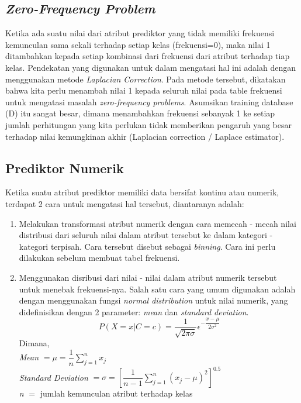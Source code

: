 \subsection{\textit{Zero-Frequency Problem}}
\label{subsec:Zero-Frequency Problem}
\cite{PeughMissing:2004} 
Ketika ada suatu nilai dari atribut prediktor yang tidak memiliki frekuensi kemunculan sama sekali terhadap setiap kelas (frekuensi=0), maka nilai 1 ditambahkan kepada setiap kombinasi dari frekuensi dari atribut terhadap tiap kelas. Pendekatan yang digunakan untuk dalam mengatasi hal ini adalah dengan menggunakan metode \textit{Laplacian Correction}. Pada metode tersebut, dikatakan bahwa kita perlu menambah nilai 1 kepada seluruh nilai pada table frekuensi untuk mengatasi masalah \textit{zero-frequency problems}. Asumsikan training database (D) itu sangat besar, dimana menambahkan frekuensi sebanyak 1 ke setiap jumlah perhitungan yang kita perlukan tidak memberikan pengaruh yang besar terhadap nilai kemungkinan akhir (Laplacian correction / Laplace estimator).

\subsection{Prediktor Numerik}
\label{subsec:Prediktor Numerik}
\cite{garg2013design} 
Ketika suatu atribut prediktor memiliki data bersifat kontinu atau numerik, terdapat 2 cara untuk mengatasi hal tersebut, diantaranya adalah:
\begin{enumerate}
	\item Melakukan transformasi atribut numerik dengan cara memecah - mecah nilai distribusi dari seluruh nilai dalam atribut tersebut ke dalam kategori - kategori terpisah. Cara tersebut disebut sebagai \textit{binning}. Cara ini perlu dilakukan sebelum membuat tabel frekuensi.
	
	\item Menggunakan disribusi dari nilai - nilai dalam atribut numerik tersebut untuk menebak frekuensi-nya. Salah satu cara yang umum digunakan adalah dengan menggunakan fungsi \textit{normal distribution} untuk nilai numerik, yang didefinisikan dengan 2 parameter: \textit{mean} dan \textit{standard deviation}.
	\begin{equation}
	P(X=x|C=c) = \dfrac{1}{\sqrt{2\pi\sigma}}\epsilon^{-\dfrac{x-\mu}{2\sigma^2}}
	\end{equation}
	Dimana,\\
	\textit{Mean} $= \mu = \dfrac{1}{n}\sum^n_{j=1}x_j$\\
	\textit{Standard Deviation} $= \sigma = [\dfrac{1}{n-1}\sum^n_{j=1}(x_j-\mu)^2]^{0.5}$\\
	\textit{n} $=$ jumlah kemunculan atribut terhadap kelas
	
	
\end{enumerate}


